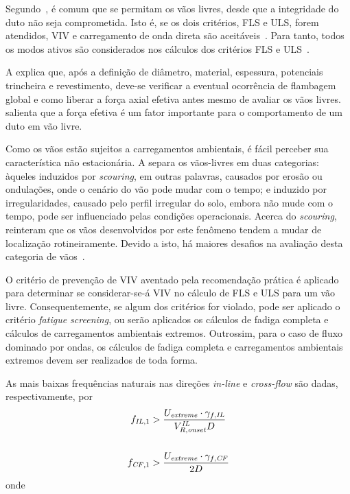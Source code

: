 Segundo~\citet{Mork2003}, é comum que se permitam os vãos livres, desde que a integridade do duto não seja comprometida. Isto é, se os dois critérios, FLS e ULS, forem atendidos, VIV e carregamento de onda direta são aceitáveis~\cite{DNV2017}. Para tanto, todos os modos ativos são considerados nos cálculos dos critérios FLS e ULS~\cite{Mork2003}.

A  explica que, após a definição de diâmetro, material, espessura, potenciais trincheira e revestimento, deve-se verificar a eventual ocorrência de flambagem global e como liberar a força axial efetiva antes mesmo de avaliar os vãos livres. \citet{Skomedal1991} salienta que a força efetiva é um fator importante para o comportamento de um duto em vão livre.

Como os vãos estão sujeitos a carregamentos ambientais, é fácil perceber sua característica não estacionária. A  separa os vãos-livres em duas categorias: àqueles induzidos por \textit{scouring}, em outras palavras, causados por erosão ou ondulações, onde o cenário do vão pode mudar com o tempo; e induzido por irregularidades, causado pelo perfil irregular do solo, embora não mude com o tempo, pode ser influenciado pelas condições operacionais. Acerca do \textit{scouring},~\citet{Sumer1995} reinteram que os vãos desenvolvidos por este fenômeno tendem a mudar de localização rotineiramente. Devido a isto, há maiores desafios na avaliação desta categoria de vãos~\cite{Mork1999}.

O critério de prevenção de VIV aventado pela recomendação prática é aplicado para determinar se considerar-se-á VIV no cálculo de FLS e ULS para um vão livre. Consequentemente, se algum dos critérios for violado, pode ser aplicado o critério \textit{fatigue screening}, ou serão aplicados os cálculos de fadiga completa e cálculos de carregamentos ambientais extremos. Outrossim, para o caso de fluxo dominado por ondas, os cálculos de fadiga completa e carregamentos ambientais extremos devem ser realizados de toda forma.

As mais baixas frequências naturais nas direções \textit{in-line} e \textit{cross-flow} são dadas, respectivamente, por
\begin{equation}
\label{eq:jdsn-ineq}
\begin{aligned}
f_{\mathit{IL},1} &> \frac{U_\mathit{extreme} \cdot \gamma_{f, \mathit{IL}}}{ V_{R, \mathit{onset}}^\mathit{IL} D}\\
\\
f_{\mathit{CF},1} &> \frac{U_\mathit{extreme} \cdot \gamma_{f, \mathit{CF}}}{2 D}
\end{aligned}\\
\end{equation}
onde

